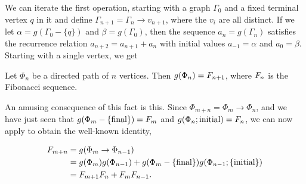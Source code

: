 We can iterate the first operation, starting with a graph $\Gamma_0$ and a fixed terminal vertex $q$ in it and define $\Gamma_{n + 1} = \Gamma_{n} \rightarrow v_{n + 1}$, where the $v_i$ are all distinct.
If we let $\alpha = g(\Gamma_0 - \{q\})$ and $\beta = g(\Gamma_0)$, then the sequence $a_n = g(\Gamma_n)$ satisfies the recurrence relation $a_{n + 2} = a_{n + 1} + a_{n}$ with initial values $a_{-1} = \alpha$ and $a_0 = \beta$.
Starting with a single vertex, we get

\begin{prop}
	Let $\Phi_n$ be a directed path of $n$ vertices.
Then $g(\Phi_n) = F_{n + 1}$, where $F_{n}$ is the Fibonacci sequence.
\end{prop}

An amusing consequence of this fact is this.
Since $\Phi_{m + n} = \Phi_m \rightarrow \Phi_n$, and we have just seen that $g(\Phi_m - \{\text{final}\}) = F_{m}$ and $g(\Phi_n; \text{initial}) = F_{n}$, 
we can now apply \hyperref[eustick]{} to obtain the well-known identity, \begin{enumrealm}
\begin{align*}
	F_{m + n} &= g(\Phi_m \rightarrow \Phi_{n - 1}) \\
	&= g(\Phi_m)g(\Phi_{n - 1}) + g(\Phi_m - \{\text{final}\})g(\Phi_{n - 1}; \{\text{initial}\}) \\
	&= F_{m + 1}F_{n} + F_{m}F_{n - 1}.
\end{align*}\end{enumrealm}
\vspace{-\baselineskip}

